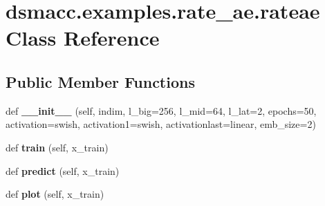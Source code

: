 \hypertarget{classdsmacc_1_1examples_1_1rate__ae_1_1rateae}{}\section{dsmacc.\+examples.\+rate\+\_\+ae.\+rateae Class Reference}
\label{classdsmacc_1_1examples_1_1rate__ae_1_1rateae}
\subsection*{Public Member Functions}
\begin{DoxyCompactItemize}
\item 
\mbox{\label{classdsmacc_1_1examples_1_1rate__ae_1_1rateae_aa1f03a37b7f94cbdab8db45ad265b599}} 
def {\bfseries \+\_\+\+\_\+init\+\_\+\+\_\+} (self, indim, l\+\_\+big=256, l\+\_\+mid=64, l\+\_\+lat=2, epochs=50, activation=\textquotesingle{}swish\textquotesingle{}, activation1=\textquotesingle{}swish\textquotesingle{}, activationlast=\textquotesingle{}linear\textquotesingle{}, emb\+\_\+size=2)
\item 
\mbox{\label{classdsmacc_1_1examples_1_1rate__ae_1_1rateae_a3c90105c7901ec79328da34e2b31d6a1}} 
def {\bfseries train} (self, x\+\_\+train)
\item 
\mbox{\label{classdsmacc_1_1examples_1_1rate__ae_1_1rateae_a3f28d670a40908d5998c0e83cde2569c}} 
def {\bfseries predict} (self, x\+\_\+train)
\item 
\mbox{\label{classdsmacc_1_1examples_1_1rate__ae_1_1rateae_a86409db35837d4d70887f30c1b14f4da}} 
def {\bfseries plot} (self, x\+\_\+train)
\end{DoxyCompactItemize}
